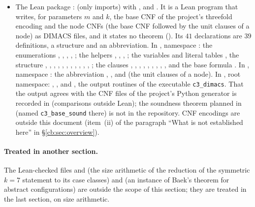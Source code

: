 \begin{itemize}
  an \texttt{\#eval} harness, without theorems of its own. These review files are tests and audits, not results;
  their prelude copies duplicate covered declarations.
\item The Lean package :  (only imports) with ,
   and . It is a Lean program that writes, for
  parameters $m$ and $k$, the base CNF of the project's threefold encoding and the node CNFs (the base CNF followed by
  the unit clauses of a node) as DIMACS files, and it states no theorem (). Its $41$ declarations
  are $39$ definitions, a structure and an abbreviation. In , namespace : the
  enumerations , , , , ; the helpers ,
  , , ; the variables and literal tables , the structure
  , , , , , ,
  , , , , , ; the
  clauses , , , , , , ,
  , ,  and the base formula . In
  , namespace : the abbreviation , ,
   and  (the unit clauses of a node). In , root
  namespace: , ,  and , the output routines of the executable
  \texttt{c3\_dimacs}. That the output agrees with the CNF files of the project's Python generator is recorded in
   (comparisons outside Lean); the soundness theorem planned in  (named
  \texttt{c3\_base\_sound} there) is not in the repository. CNF encodings are outside this document (item~(ii) of the
  paragraph ``What is not established here'' in \S\ref{cb:sec:overview}).
\end{itemize}

\paragraph{Treated in another section.} The Lean-checked files  and
 (the size arithmetic of the reduction of the symmetric
$k=7$ statement to its case classes) and  (an instance of Baek's
theorem for abstract configurations) are outside the scope of this section; they are treated in the last section,
on size arithmetic.

